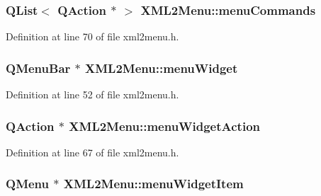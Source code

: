 \hypertarget{classXML2Menu_a6b956ab3cc4eb0e148736a077b003a50}{
\subsubsection[{menuCommands}]{\setlength{\rightskip}{0pt plus 5cm}QList$<$ QAction $\ast$ $>$ {\bf XML2Menu::menuCommands}}}
\label{classXML2Menu_a6b956ab3cc4eb0e148736a077b003a50}


Definition at line 70 of file xml2menu.h.

\hypertarget{classXML2Menu_abb96af1c6a8aec202902250e17d1b4f8}{
\subsubsection[{menuWidget}]{\setlength{\rightskip}{0pt plus 5cm}QMenuBar $\ast$ {\bf XML2Menu::menuWidget}}}
\label{classXML2Menu_abb96af1c6a8aec202902250e17d1b4f8}


Definition at line 52 of file xml2menu.h.

\hypertarget{classXML2Menu_a9a8070ff51e88a2d9bbdcb476c701b96}{
\subsubsection[{menuWidgetAction}]{\setlength{\rightskip}{0pt plus 5cm}QAction $\ast$ {\bf XML2Menu::menuWidgetAction}}}
\label{classXML2Menu_a9a8070ff51e88a2d9bbdcb476c701b96}


Definition at line 67 of file xml2menu.h.

\hypertarget{classXML2Menu_aef3b2dd32010ef176178277075ddb0e2}{
\subsubsection[{menuWidgetItem}]{\setlength{\rightskip}{0pt plus 5cm}QMenu $\ast$ {\bf XML2Menu::menuWidgetItem}}}
\label{classXML2Menu_aef3b2dd32010ef176178277075ddb0e2}


